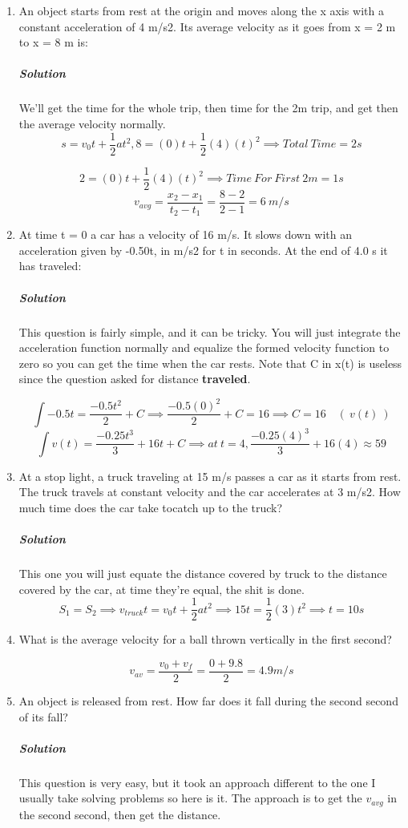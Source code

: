 \documentclass{article}
\begin{document}
\begin{enumerate}[1.]
	\item An object starts from rest at the origin and moves along the x axis with a constant acceleration of 4 m/s2. Its average velocity as it goes from x = 2 m to x = 8 m is:
		\subparagraph{Solution}
		We'll get the time for the whole trip, then time for the 2m trip, and get then the average velocity normally.
		\[
			s = v_0 t + \frac{ 1 }{ 2 } a t^2
			, 8 = (0) t + \frac{1}{2} (4)(t)^2 \implies Total\ Time = 2s
		\]

		\[
			2 = (0) t + \frac{1}{2} (4)(t)^2 \implies Time\ For\ First\ 2m = 1s
		\]
		\[
			v_{avg} = \frac{ x_2 - x_1 }{  t_2 - t_1	} = \frac{ 8-2 }{ 2-1 } = 6\ m/s 	
		\]

	\item  At time t = 0 a car has a velocity of 16 m/s. It slows down with an acceleration given by -0.50t, in m/s2 for t in seconds. At the end of 4.0 s it has traveled:
		\subparagraph{Solution}
		This question is fairly simple, and it can be tricky. You will just integrate the acceleration function normally and equalize the formed velocity function to zero so you can get the time when the car rests. Note that C in x(t) is useless since the question asked for distance \textbf{traveled}.

		\[
			\int -0.5 t = \frac{ -0.5 t^2 }{ 2 } + C \implies \frac{ -0.5 (0)^2 }{ 2 } + C = 16 \implies C=16 \quad  (\ v(t)\ )
		\]
		\[	
		\int v(t) = \frac{ -0.25 t^3 }{ 3 } + 16 t + C \implies at\ t=4, \frac{ -0.25 (4)^3 }{ 3 } + 16 (4) \approx 59 
		\]

	\item At a stop light, a truck traveling at 15 m/s passes a car as it starts from rest. The truck travels at constant velocity and the car accelerates at 3 m/s2. How much time does the car take tocatch up to the truck?

		\subparagraph{Solution}
		This one you will just equate the distance covered by truck to the distance covered by the car, at time they're equal, the shit is done.
		\[
			S_1	= S_2 \implies v_{truck} t = v_0 t + \frac{ 1 }{ 2 } a t^2 \implies 15 t = \frac{ 1 }{ 2 } (3) t^2 \implies t = 10s
		\]
	\item What is the average velocity for a ball thrown vertically in the first second?

		\[
			v_{av} = \frac{ v_0 + v_f }{ 2 } = \frac{ 0 + 9.8 }{ 2 } = 4.9 m/s 
		\]

		\newpage
	\item An object is released from rest. How far does it fall during the second second of its fall?
		\subparagraph{Solution}
		This question is very easy, but it took an approach different to the one I usually take solving problems so here is it. The approach is to get the $ v_{avg} $  in the second second, then get the distance.


\end{enumerate}
\end{document}
